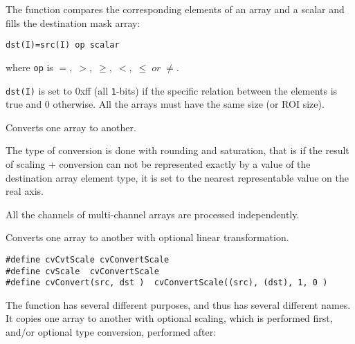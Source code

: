 The function compares the corresponding elements of an array and a scalar and fills the destination mask array:

\begin{lstlisting}
dst(I)=src(I) op scalar
\end{lstlisting}

where \texttt{op} is $=,\; >,\; \ge,\; <,\; \le\; or\; \ne$.

\texttt{dst(I)} is set to 0xff (all \texttt{1}-bits) if the specific relation between the elements is true and 0 otherwise. All the arrays must have the same size (or ROI size).

\ifPy %
Converts one array to another.


\begin{description}
\end{description}


The type of conversion is done with rounding and saturation, that is if the
result of scaling + conversion can not be represented exactly by a value
of the destination array element type, it is set to the nearest representable
value on the real axis.

All the channels of multi-channel arrays are processed independently.

\fi %

Converts one array to another with optional linear transformation.


\ifC
\begin{lstlisting}
#define cvCvtScale cvConvertScale
#define cvScale  cvConvertScale
#define cvConvert(src, dst )  cvConvertScale((src), (dst), 1, 0 )
\end{lstlisting}
\fi

\begin{description}
\end{description}


The function has several different purposes, and thus has several different names. It copies one array to another with optional scaling, which is performed first, and/or optional type conversion, performed after:


